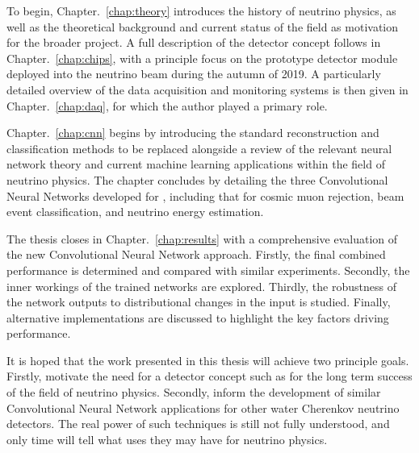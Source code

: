 To begin, Chapter.~\ref{chap:theory} introduces the history of neutrino physics, as well as the
theoretical background and current status of the field as motivation for the broader \chips
project. A full description of the \chips detector concept follows in Chapter.~\ref{chap:chips},
with a principle focus on the \chipsfive prototype detector module deployed into the \numi
neutrino beam during the autumn of 2019. A particularly detailed overview of the \chipsfive data
acquisition and monitoring systems is then given in Chapter.~\ref{chap:daq}, for which the author
played a primary role.

Chapter.~\ref{chap:cnn} begins by introducing the standard reconstruction and classification
methods to be replaced alongside a review of the relevant neural network theory and current
machine learning applications within the field of neutrino physics. The chapter concludes by
detailing the three Convolutional Neural Networks developed for \chipsfive, including that for
cosmic muon rejection, beam event classification, and neutrino energy estimation.

The thesis closes in Chapter.~\ref{chap:results} with a comprehensive evaluation of the new
Convolutional Neural Network approach. Firstly, the final combined performance is determined and
compared with similar experiments. Secondly, the inner workings of the trained networks are
explored. Thirdly, the robustness of the network outputs to distributional changes in the input is
studied. Finally, alternative implementations are discussed to highlight the key factors driving
performance.

It is hoped that the work presented in this thesis will achieve two principle goals. Firstly,
motivate the need for a detector concept such as \chips for the long term success of the field of
neutrino physics. Secondly, inform the development of similar Convolutional Neural Network
applications for other water Cherenkov neutrino detectors. The real power of such techniques is
still not fully understood, and only time will tell what uses they may have for neutrino physics.